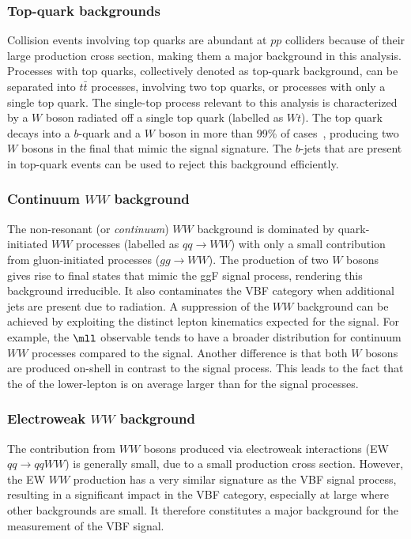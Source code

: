 \subsubsection{Top-quark backgrounds}
Collision events involving top quarks are abundant at $pp$ colliders because of their large production cross section, making them a major background in this analysis.
Processes with top quarks, collectively denoted as top-quark background, can be separated into $t\bar{t}$ processes, involving two top quarks, or processes with only a single top quark. 
The single-top process relevant to this analysis is characterized by a $W$ boson radiated off a single top quark (labelled as $Wt$). 
The top quark decays into a $b$-quark and a $W$ boson in more than 99\% of cases~\cite{PDG2020}, producing two $W$ bosons in the final that mimic the signal signature. 
The $b$-jets that are present in top-quark events can be used to reject this background efficiently.

\subsubsection{Continuum $WW$ background}
The non-resonant (or \emph{continuum}) $WW$ background is dominated by quark-initiated $WW$ processes (labelled as $qq \to WW$) with only a small contribution from gluon-initiated processes ($gg \to WW$). 
The production of two $W$ bosons gives rise to final states that mimic the ggF signal process, rendering this background irreducible. 
It also contaminates the VBF \TwoJet category when additional jets are present due to radiation. 
A suppression of the $WW$ background can be achieved by exploiting the distinct lepton kinematics expected for the signal. For example, the $\mll$ observable tends to have a broader distribution for continuum $WW$ processes compared to the signal. 
Another difference is that both $W$ bosons are produced on-shell in contrast to the signal process. 
This leads to the fact that the \pT of the lower-\pT lepton is on average larger than for the signal processes. 

\subsubsection{Electroweak $WW$ background}
The contribution from $WW$ bosons produced via electroweak interactions (EW $qq \to qqWW$) is generally small, due to a small production cross section. However, the EW $WW$ production has a very similar signature as the VBF signal process, resulting in a significant impact in the VBF category, especially at large \mjj where other backgrounds are small. 
It therefore constitutes a major background for the measurement of the VBF signal. 

